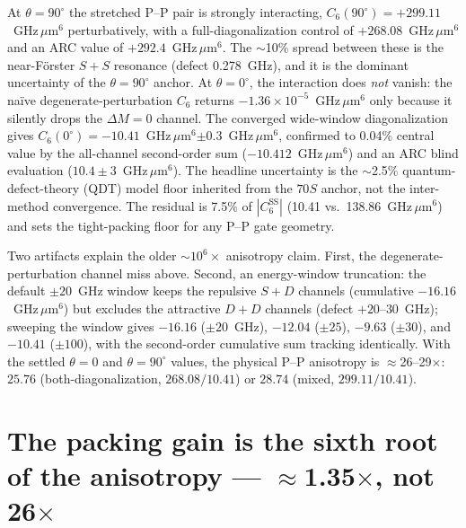 \documentclass[twocolumn]{article}
\newcommand{\gum}[1]{GHz\,$\mu$m$^{#1}$}%
\begin{document}
At $\theta=90^\circ$ the stretched P--P pair is strongly interacting, $C_6(90^\circ)=+299.11$~\gum{6} perturbatively, with a full-diagonalization control of $+268.08$~\gum{6} and an ARC value of $+292.4$~\gum{6}. The $\sim$10\% spread between these is the near-F\"orster $S+S$ resonance (defect 0.278~GHz), and it is the dominant uncertainty of the $\theta=90^\circ$ anchor. At $\theta=0^\circ$, the interaction does \emph{not} vanish: the na\"ive degenerate-perturbation $C_6$ returns $-1.36\times10^{-5}$~\gum{6} only because it silently drops the $\Delta M=0$ channel. The converged wide-window diagonalization gives $C_6(0^\circ)=-10.41$~\gum{6}$\pm0.3$~\gum{6}, confirmed to 0.04\% central value by the all-channel second-order sum ($-10.412$~\gum{6}) and an ARC blind evaluation ($10.4\pm3$~\gum{6}). The headline uncertainty is the $\sim$2.5\% quantum-defect-theory (QDT) model floor inherited from the $70S$ anchor, not the inter-method convergence. The residual is 7.5\% of $|C_6^{\text{SS}}|$ (10.41 vs.\ 138.86~\gum{6}) and sets the tight-packing floor for any P--P gate geometry.

Two artifacts explain the older $\sim10^6\times$ anisotropy claim. First, the degenerate-perturbation channel miss above. Second, an energy-window truncation: the default $\pm20$~GHz window keeps the repulsive $S{+}D$ channels (cumulative $-16.16$~\gum{6}) but excludes the attractive $D{+}D$ channels (defect $+20$--$30$~GHz); sweeping the window gives $-16.16$ ($\pm20$~GHz), $-12.04$ ($\pm25$), $-9.63$ ($\pm30$), and $-10.41$ ($\pm100$), with the second-order cumulative sum tracking identically. With the settled $\theta=0$ and $\theta=90^\circ$ values, the physical P--P anisotropy is $\approx$26--29$\times$: $25.76$ (both-diagonalization, $268.08/10.41$) or $28.74$ (mixed, $299.11/10.41$).

\section{The packing gain is the sixth root of the anisotropy --- $\approx$1.35$\times$, not 26$\times$}
\label{sec:sixthroot}
\end{document}
